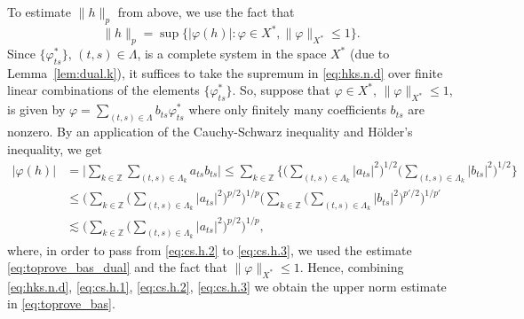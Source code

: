 \documentclass[reqno,a4paper,12pt]{amsart}
\numberwithin{equation}{section}
\numberwithin{figure}{section}
\newcommand\Z{\mathbb{Z}}
\newcommand\1{\mathds{1}}
\newcommand{\pphi}{\varphi}
\renewcommand\le{\leqslant}
\theoremstyle{plain}
\newcommand{\lemref}[1]{Lemma~\ref{#1}}
\theoremstyle{definition}
\begin{document}
To estimate $\|h\|_p$ from above, we use the fact that
\begin{equation}
\label{eq:hks.n.d}
\|h \|_{p} = \sup \{ | \pphi(h) | : \pphi \in X^*, \|\pphi\|_{X^*} \le 1 \}.
\end{equation}
Since $ \{\pphi^*_{ts}\}$, $(t,s)\in\Lambda$, is a complete system
in the space $X^*$ (due to \lemref{lem:dual.k}),
it suffices to take the supremum in \eqref{eq:hks.n.d}
over finite linear combinations of the elements 
$ \{\pphi^*_{ts}\}$.  So, suppose that $\pphi \in X^*$,
 $\| \pphi \|_{X^*} \le 1$, is given by
$\pphi = \sum_{(t,s)\in\Lambda}  b_{ts} \pphi_{ts}^*$
where only finitely many coefficients $b_{ts}$ are nonzero.
By an application of the Cauchy-Schwarz inequality and H\"{o}lder's inequality, we get
\begin{align}
 |\pphi(h)| &=
  \Big| \sum_{k \in \Z} \sum_{(t,s)\in\Lambda_k}  a_{ts} b_{ts} \Big|
 \le \sum_{k \in \Z} \Big\{ \Big( \sum_{(t,s)\in\Lambda_k}  |a_{ts}|^2 \Big)^{1/2}
 \Big( \sum_{(t,s)\in\Lambda_k}  |b_{ts}|^2 \Big)^{1/2} \Big\} \label{eq:cs.h.1} \\
& \le \Big( \sum_{k \in \Z} \Big( \sum_{(t,s)\in\Lambda_k}  |a_{ts}|^2 \Big)^{p/2} \Big)^{1/p}
 \Big( \sum_{k \in \Z} \Big( \sum_{(t,s)\in\Lambda_k}  |b_{ts}|^2 \Big)^{p'/2} \Big)^{1/p'} \label{eq:cs.h.2} \\
& \lesssim \Big( \sum_{k \in \Z} \Big( \sum_{(t,s)\in\Lambda_k}  |a_{ts}|^2 \Big)^{p/2} \Big)^{1/p}, \label{eq:cs.h.3}
\end{align}
where, in order to pass from \eqref{eq:cs.h.2}  to \eqref{eq:cs.h.3},
we used the estimate \eqref{eq:toprove_bas_dual}  and the fact that  $\|\pphi\|_{X^*} \le 1$.
Hence, combining  \eqref{eq:hks.n.d}, \eqref{eq:cs.h.1}, \eqref{eq:cs.h.2}, \eqref{eq:cs.h.3}
we obtain the upper norm estimate in \eqref{eq:toprove_bas}.
\end{document}
